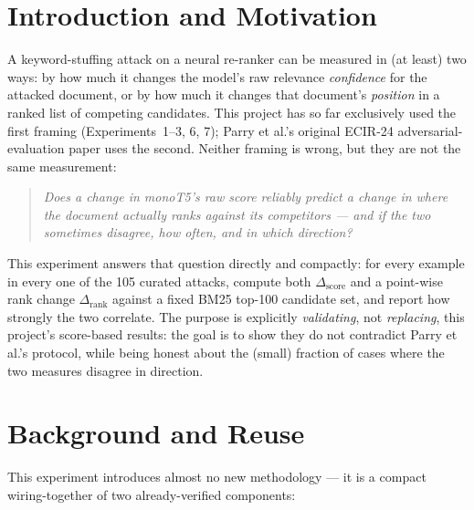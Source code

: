 \documentclass[11pt]{article}
\newcommand{\score}{\operatorname{score}}
\newcommand{\rank}{\operatorname{rank}}
\begin{document}
\section{Introduction and Motivation}

A keyword-stuffing attack on a neural re-ranker can be measured in (at
least) two ways: by how much it changes the model's raw relevance
\emph{confidence} for the attacked document, or by how much it changes that
document's \emph{position} in a ranked list of competing candidates. This
project has so far exclusively used the first framing (Experiments~1--3, 6,
7); Parry et al.'s original ECIR-24 adversarial-evaluation paper uses the
second. Neither framing is wrong, but they are not the same measurement:

\begin{quote}
\itshape Does a change in monoT5's raw score reliably predict a change in
where the document actually ranks against its competitors --- and if the
two sometimes disagree, how often, and in which direction?
\end{quote}

This experiment answers that question directly and compactly: for every
example in every one of the 105 curated attacks, compute both
$\Delta_{\score}$ and a point-wise rank change $\Delta_{\rank}$ against a
fixed BM25 top-100 candidate set, and report how strongly the two
correlate. The purpose is explicitly \emph{validating}, not
\emph{replacing}, this project's score-based results: the goal is to show
they do not contradict Parry et al.'s protocol, while being honest about
the (small) fraction of cases where the two measures disagree in direction.

\section{Background and Reuse}

This experiment introduces almost no new methodology --- it is a
compact wiring-together of two already-verified components:
\end{document}
